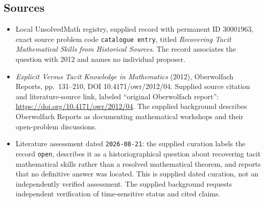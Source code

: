 \documentclass[11pt]{article}
\begin{document}
\subsection{Sources}
\begin{itemize}
\item Local UnsolvedMath registry, supplied record with permanent ID \(30001963\), exact source problem code \texttt{catalogue entry}, titled \emph{Recovering Tacit Mathematical Skills from Historical Sources}. The record associates the question with 2012 and names no individual proposer.
\item \emph{Explicit Versus Tacit Knowledge in Mathematics} (2012), Oberwolfach Reports, pp.~131--210, DOI 10.4171/owr/2012/04. Supplied source citation and literature-source link, labeled ``original Oberwolfach report'': \url{https://doi.org/10.4171/owr/2012/04}. The supplied background describes Oberwolfach Reports as documenting mathematical workshops and their open-problem discussions.
\item Literature assessment dated \texttt{2026-08-21}: the supplied curation labels the record \texttt{open}, describes it as a historiographical question about recovering tacit mathematical skills rather than a resolved mathematical theorem, and reports that no definitive answer was located. This is supplied dated curation, not an independently verified assessment. The supplied background requests independent verification of time-sensitive status and cited claims.
\end{itemize}
\end{document}
